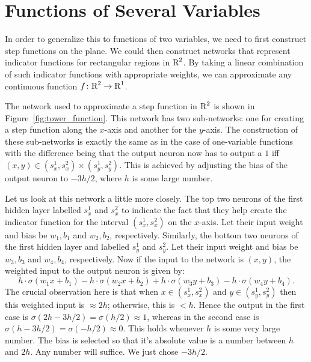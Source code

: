 \section{Functions of Several Variables}

In order to generalize this to functions of two variables, we need to first 
construct step functions on the plane. We could then construct networks 
that represent indicator functions for rectangular regions in $\text{R}^2$. By taking a 
linear combination of such indicator functions with appropriate weights, we can 
approximate any continuous function $f \colon \text{R}^2 \to \text{R}^1$. 

The network used to approximate a step function in $\text{R}^2$ is shown in 
Figure~\ref{fig:tower_function}. This network has two sub-networks: one 
for creating a step function along the $x$-axis and another for the $y$-axis. 
The construction of these sub-networks is exactly the same as in the case of 
one-variable functions with the difference being that the output neuron now has to 
output a $1$ iff $(x, y) \in (s_x^1, s_x^2) \times (s_y^1, s_y^2)$. This is achieved 
by adjusting the bias of the output neuron to $- 3h/2$, where $h$ is some large number.
  
Let us look at this network a little more closely. 
The top two neurons of the first hidden layer labelled $s_x^1$ and $s_x^2$ to indicate 
the fact that they help create the indicator function for the interval $(s_x^1, s_x^2)$ 
on the $x$-axis. Let their input weight and bias be $w_1, b_1$ and $w_2, b_2$, respectively. 
Similarly, the bottom two neurons of the first hidden layer and labelled $s_y^1$ and $s_y^2$.
Let their input weight and bias be $w_3, b_3$ and $w_4, b_4$, respectively. Now if the input 
to the network is $(x, y)$, the weighted input to the output neuron is given by:
\[
    h \cdot \sigma (w_1 x + b_1) - h \cdot \sigma (w_2 x + b_2) + h \cdot \sigma (w_3 y + b_3) 
    -h \cdot \sigma (w_4 y + b_4).
\]
The crucial observation here is that when $x \in (s_x^1, s_x^2)$ and $y \in (s_y^1, s_y^2)$ 
then this weighted input is $\approx 2h$; otherwise, this is $< h$. Hence the output in the 
first case is $\sigma (2h - 3h/2) = \sigma (h / 2) \approx 1$, whereas in the second case
is $\sigma (h - 3h/2) = \sigma (-h/2) \approx 0$. This holds whenever $h$ is some very large number.
The bias is selected so that it's absolute value is a number between $h$ and $2h$. Any number will 
suffice. We just chose $-3h/2$.

